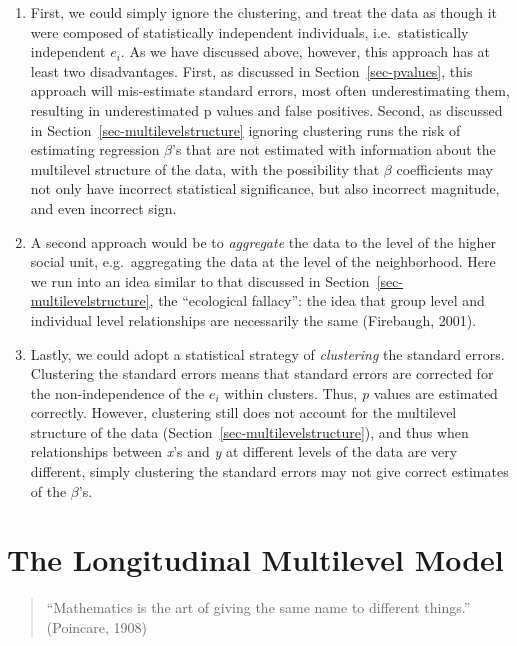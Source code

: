 \documentclass[
  letterpaper,
  DIV=11,
  numbers=noendperiod]{scrreprt}
\providecommand{\tightlist}{%
  \setlength{\itemsep}{0pt}\setlength{\parskip}{0pt}}\usepackage{longtable,booktabs,array}
\begin{document}
\begin{enumerate}
\def\labelenumi{\arabic{enumi}.}
\tightlist
\item
  First, we could simply ignore the clustering, and treat the data as
  though it were composed of statistically independent individuals,
  i.e.~statistically independent \(e_i\). As we have discussed above,
  however, this approach has at least two disadvantages. First, as
  discussed in Section~\ref{sec-pvalues}, this approach will
  mis-estimate standard errors, most often underestimating them,
  resulting in underestimated p values and false positives. Second, as
  discussed in Section~\ref{sec-multilevelstructure} ignoring clustering
  runs the risk of estimating regression \(\beta\)'s that are not
  estimated with information about the multilevel structure of the data,
  with the possibility that \(\beta\) coefficients may not only have
  incorrect statistical significance, but also incorrect magnitude, and
  even incorrect sign.
\item
  A second approach would be to \emph{aggregate} the data to the level
  of the higher social unit, e.g.~aggregating the data at the level of
  the neighborhood. Here we run into an idea similar to that discussed
  in Section~\ref{sec-multilevelstructure}, the ``ecological fallacy'':
  the idea that group level and individual level relationships are
  necessarily the same (Firebaugh, 2001).
\item
  Lastly, we could adopt a statistical strategy of \emph{clustering} the
  standard errors. Clustering the standard errors means that standard
  errors are corrected for the non-independence of the \(e_i\) within
  clusters. Thus, \emph{p} values are estimated correctly. However,
  clustering still does not account for the multilevel structure of the
  data (Section~\ref{sec-multilevelstructure}), and thus when
  relationships between \emph{x}'s and \emph{y} at different levels of
  the data are very different, simply clustering the standard errors may
  not give correct estimates of the \(\beta\)'s.
\end{enumerate}


\hypertarget{the-longitudinal-multilevel-model}{%
\chapter{The Longitudinal Multilevel
Model}\label{the-longitudinal-multilevel-model}}

\begin{quote}
``Mathematics is the art of giving the same name to different things.''
(Poincare, 1908)
\end{quote}
\end{document}
